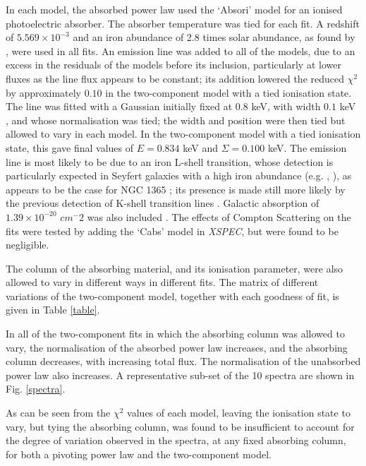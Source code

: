 \documentclass[useAMS,usenatbib]{sam}
\begin{document}
In each model, the absorbed power law used the ‘Absori’ model for an ionised photoelectric absorber. The absorber temperature was tied for each fit. A redshift of $5.569
\times 10^{−3}$ \citep{lavaux} and an iron abundance of 2.8 times solar abundance, as found by \citet{risaliti09}, were used in all fits. An emission line was added to
all of the models, due to an excess in the residuals of the models before its inclusion, particularly at lower fluxes as the line flux appears to be constant; its
addition lowered the reduced $\chi^2$ by approximately $0.10$ in the two-component model with a tied ionisation state. The line was fitted with a Gaussian initially fixed
at $0.8$ keV, with width $0.1$ keV , and whose normalisation was tied; the width and position were then tied but allowed to vary in each model. In the two-component model
with a tied ionisation state, this gave final values of $E = 0.834$ keV and $\Sigma = 0.100$ keV. The emission line is most likely to be due to an iron L-shell
transition, whose detection is particularly expected in Seyfert galaxies with a high iron abundance (e.g. \citet{markowitz}, \citet{fabian09}), as appears to be the case
for NGC 1365 \citep{risaliti09}; its presence is made still more likely by the previous detection of K-shell transition lines \citep{risaliti05a}. Galactic absorption of
$1.39 \times 10^{−20}$ $cm^−{2}$ was also included \citep{dickey90}. The effects of Compton Scattering on the fits were tested by adding the ‘Cabs’ model in {\it XSPEC},
but were found to be negligible.

The column of the absorbing material, and its ionisation parameter, were also allowed to vary in different ways in different fits. The matrix of different variations of
the two-component model, together with each goodness of fit, is given in Table \ref{table}.

In all of the two-component fits in which the absorbing column was allowed to vary, the normalisation of the absorbed power law increases, and the absorbing column
decreases, with increasing total flux. The normalisation of the unabsorbed power law also increases. A representative sub-set of the 10 spectra are shown in Fig.
\ref{spectra}.

As can be seen from the $\chi^2$ values of each model, leaving the ionisation state to vary, but tying the absorbing column, was found to be insufficient to account for
the degree of variation observed in the spectra, at any fixed absorbing column, for both a pivoting power law and the two-component model. 
\end{document}
